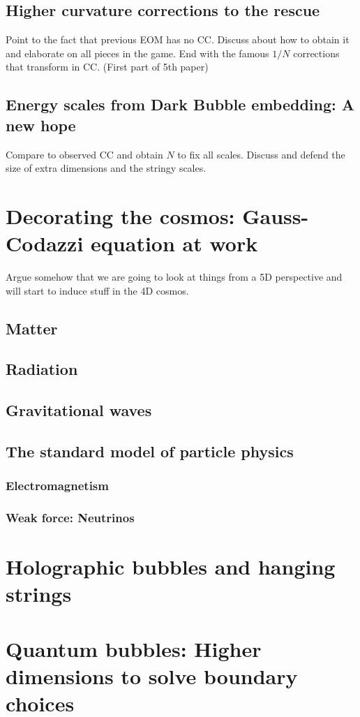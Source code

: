\documentclass[12pt, a4paper]{article} %
\begin{document}
\subsection{Higher curvature corrections to the rescue}
Point to the fact that previous EOM has no CC. Discuss about how to obtain it and elaborate on all pieces in the game. End with the famous $1/N$ corrections that transform in CC. (First part of 5th paper)
\subsection{Energy scales from Dark Bubble embedding: A new hope}
Compare to observed CC and obtain $N$ to fix all scales. Discuss and defend the size of extra dimensions and the stringy scales.
\section{Decorating the cosmos: Gauss-Codazzi equation at work}
Argue somehow that we are going to look at things from a 5D perspective and will start to induce stuff in the 4D cosmos.
\subsection{Matter}
\subsection{Radiation}
\subsection{Gravitational waves}
\subsection{The standard model of particle physics}
\subsubsection{Electromagnetism}
\subsubsection{Weak force: Neutrinos}
\section{Holographic bubbles and hanging strings}
\section{Quantum bubbles: Higher dimensions to solve boundary choices}

\cite{Danielsson:2018ztv}






\end{document}
